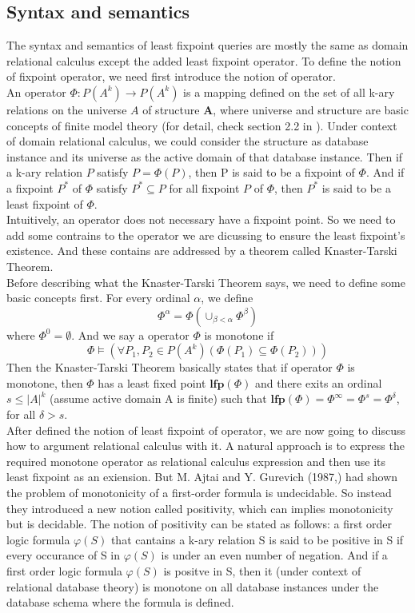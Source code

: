 \subsection{Syntax and semantics}
The syntax and semantics of least fixpoint queries are mostly the same as domain relational calculus except the added least fixpoint operator. To define the notion of fixpoint operator, we need first introduce the notion of operator. \\
An operator $\Phi: \textit{P}(A^k)\rightarrow \textit{P}(A^k)$ is a mapping defined on the set of all k-ary relations on the universe $A$ of structure $\textbf{A}$, where universe and structure are basic concepts of finite model theory (for detail, check section 2.2 in \cite{kolaitis1}). Under context of domain relational calculus, we could consider the structure as database instance and its universe as the active domain of that database instance. Then if a k-ary relation $P$ satisfy $P=\Phi(P)$, then P is said to be a fixpoint of $\Phi$. And if a fixpoint $P^*$ of $\Phi$ satisfy $P^*\subseteq P$ for all fixpoint $P$ of $\Phi$, then $P^*$ is said to be a least fixpoint of $\Phi$.\\
Intuitively, an operator does not necessary have a fixpoint point. So we need to add some contrains to the operator we are dicussing to ensure the least fixpoint's existence. And these contains are addressed by a theorem called Knaster-Tarski Theorem\cite{Tarski}. \\
Before describing what the Knaster-Tarski Theorem says, we need to define some basic concepts first. For every ordinal $\alpha$, we define 
$$\Phi^{\alpha}=\Phi(\cup_{\beta<\alpha} \Phi^{\beta})$$
where $\Phi^0=\emptyset$. And we say a operator $\Phi$ is monotone if 
$$\Phi\models(\forall P_1,P_2\in P(A^k)(\Phi(P_1)\subseteq\Phi(P_2)))$$
Then the Knaster-Tarski Theorem basically states that if operator $\Phi$ is monotone, then $\Phi$ has a least fixed point $\textbf{lfp}(\Phi)$ and there exits an ordinal $s\leq |A|^k$ (assume active domain A is finite) such that $\textbf{lfp}(\Phi)=\Phi^{\infty}=\Phi^s=\Phi^{\delta}$, for all $\delta > s$.\\
After defined the notion of least fixpoint of operator, we are now going to discuss how to argument relational calculus with it. A natural approach is to express the required monotone operator as relational calculus expression and then use its least fixpoint as an exiension. But M. Ajtai and Y. Gurevich (1987,\cite{Ajtai}) had shown the problem of monotonicity of a first-order formula is undecidable. So instead they introduced a new notion called positivity, which can implies monotonicity but is decidable. The notion of positivity can be stated as follows: a first order logic formula $\varphi(S)$ that cantains a k-ary relation S is said to be positive in S if every occurance of S in $\varphi(S)$ is under an even number of negation. And if a first order logic formula $\varphi(S)$ is positve in S, then it (under context of relational database theory) is monotone on all database instances under the database schema where the formula is defined.\\ 
